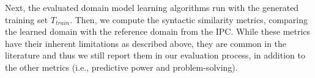 \documentclass[letterpaper]{article} %
\newcommand{\tuple}[1]{\ensuremath{\left \langle #1 \right \rangle }}
\newcommand{\T}{T}
\newcommand{\Ttrain}{\T_{train}}
\newif\ifaddcomments
\newcommand{\roni}[1]{\ifaddcomments{\textcolor{red}{[Roni: #1]}}\fi}
\newcommand{\argaman}[1]{\ifaddcomments{\textcolor{blue}{[Argaman: #1]}}\fi}
\newcommand{\leo}[1]{\ifaddcomments{\textcolor{pink}{[Leonardo: #1]}}\fi}
\begin{document}
%
%

%

Next, the evaluated domain model learning algorithms run with the generated training set $\Ttrain$. Then, we compute the syntactic similarity metrics, comparing the learned domain with the reference domain from the IPC. 
While these metrics have their inherent limitations as described above, they are common in the literature and thus we still report them in our evaluation process, in addition to the other metrics (i.e., predictive power and problem-solving). 
\end{document}
